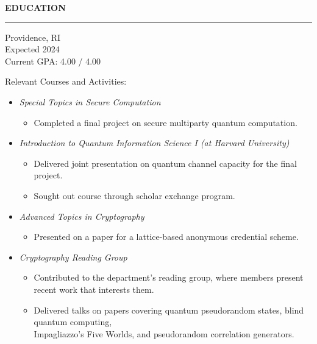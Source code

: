 \documentclass{resume} %
\begin{document}

\medskip
\MakeUppercase{{\bf Education}}
\medskip
\hrule

\hspace*{1mm}{\bf Brown University} \hfill Providence, RI \\
\hspace*{1mm}{\em Master of Science in Computer Science} \hfill Expected 2024 \\
\hspace*{1mm}Current GPA: 4.00 / 4.00

\hspace*{1mm}Relevant Courses and Activities:
\begin{itemize}[leftmargin=1em]
    \item {\em Special Topics in Secure Computation}
        \begin{itemize}[label=--]
            \item Completed a final project on secure multiparty quantum computation.
        \end{itemize}
    \item {\em Introduction to Quantum Information Science I (at Harvard University)}
        \begin{itemize}[nosep, topsep=-5mm, label=--]
            \item Delivered joint presentation on quantum channel capacity for the final project.
            \item Sought out course through scholar exchange program. %
        \end{itemize}
    \item {\em Advanced Topics in Cryptography}
        \begin{itemize}[label=--]
            \item Presented on a paper for a lattice-based anonymous credential scheme.
        \end{itemize}

    \item {\em Cryptography Reading Group}
        \begin{itemize}[nosep, topsep=-5mm, label=--]
            \item Contributed to the department's reading group, where members present recent work that interests them.
            \item Delivered talks on papers covering quantum pseudorandom states, blind quantum computing, \\
                Impagliazzo's Five Worlds, and pseudorandom correlation generators.
        \end{itemize}
\end{itemize}
\end{document}
